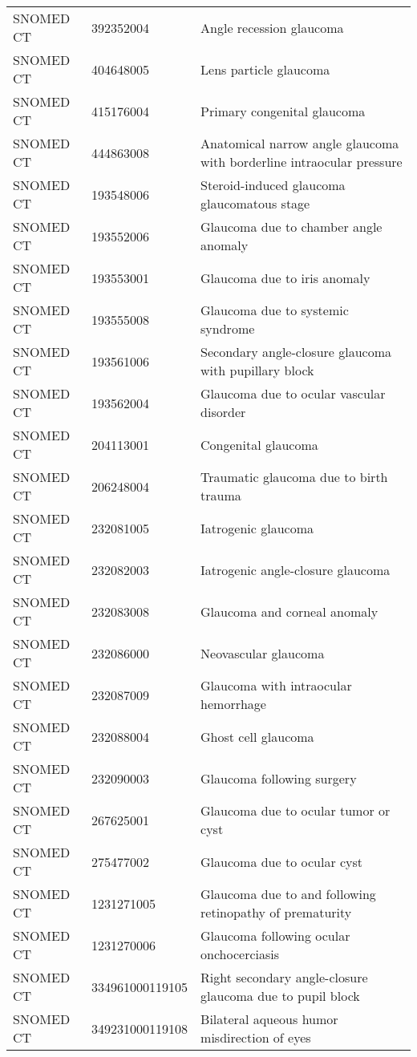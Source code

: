 \begin{longtable}{p{}p{}p{}}
  SNOMED CT & 392352004 & Angle recession glaucoma \\ 
  SNOMED CT & 404648005 & Lens particle glaucoma \\ 
  SNOMED CT & 415176004 & Primary congenital glaucoma \\ 
  SNOMED CT & 444863008 & Anatomical narrow angle glaucoma with borderline intraocular pressure \\ 
  SNOMED CT & 193548006 & Steroid-induced glaucoma glaucomatous stage \\ 
  SNOMED CT & 193552006 & Glaucoma due to chamber angle anomaly \\ 
  SNOMED CT & 193553001 & Glaucoma due to iris anomaly \\ 
  SNOMED CT & 193555008 & Glaucoma due to systemic syndrome \\ 
  SNOMED CT & 193561006 & Secondary angle-closure glaucoma with pupillary block \\ 
  SNOMED CT & 193562004 & Glaucoma due to ocular vascular disorder \\ 
  SNOMED CT & 204113001 & Congenital glaucoma \\ 
  SNOMED CT & 206248004 & Traumatic glaucoma due to birth trauma \\ 
  SNOMED CT & 232081005 & Iatrogenic glaucoma \\ 
  SNOMED CT & 232082003 & Iatrogenic angle-closure glaucoma \\ 
  SNOMED CT & 232083008 & Glaucoma and corneal anomaly \\ 
  SNOMED CT & 232086000 & Neovascular glaucoma \\ 
  SNOMED CT & 232087009 & Glaucoma with intraocular hemorrhage \\ 
  SNOMED CT & 232088004 & Ghost cell glaucoma \\ 
  SNOMED CT & 232090003 & Glaucoma following surgery \\ 
  SNOMED CT & 267625001 & Glaucoma due to ocular tumor or cyst \\ 
  SNOMED CT & 275477002 & Glaucoma due to ocular cyst \\ 
  SNOMED CT & 1231271005 & Glaucoma due to and following retinopathy of prematurity \\ 
  SNOMED CT & 1231270006 & Glaucoma following ocular onchocerciasis \\ 
  SNOMED CT & 334961000119105 & Right secondary angle-closure glaucoma due to pupil block \\ 
  SNOMED CT & 349231000119108 & Bilateral aqueous humor misdirection of eyes \\ 

\end{longtable}
